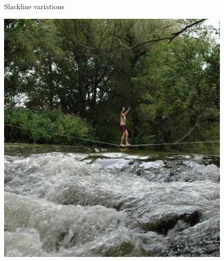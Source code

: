 \begin{figure}[htb]
\begin{minipage}[t]{0.45\linewidth}
		\label{fig:longline}
	\end{minipage}
	\caption{Slackline variations}
	\label{fig:slacklineVariation}
\end{figure}
\clearpage
\begin{figure}[htb]
	\centering
	\begin{minipage}[t]{0.45\linewidth}
		\centering
		\includegraphics[width=1\linewidth]{Pictures/3_1_waterline}
		\label{fig:waterline}
	\end{minipage}
	\hfill
	\begin{minipage}[t]{0.45\linewidth}
		\centering

\end{minipage}
\end{figure}
